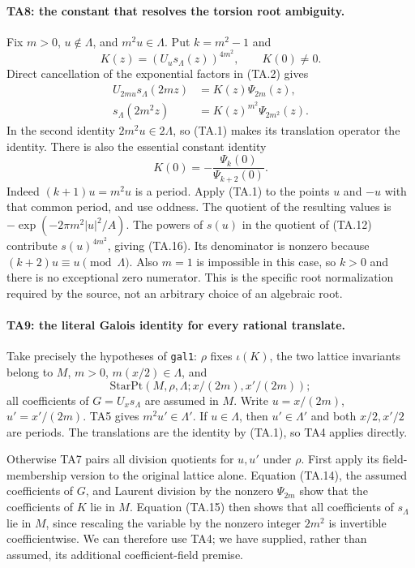 \paragraph{TA8: the constant that resolves the torsion root ambiguity.}
Fix $m>0$, $u\notin\Lambda$, and $m^2u\in\Lambda$.
Put $k=m^2-1$ and
\[
 K(z)=(U_us_\Lambda(z))^{4m^2},\qquad K(0)\ne0.
\]
Direct cancellation of the exponential factors in (TA.2)
gives
\begin{align}
 U_{2mu}s_\Lambda(2mz)&=K(z)\Psi_{2m}(z),                    \tag{TA.14}\\
 s_\Lambda(2m^2z)&=K(z)^{m^2}\Psi_{2m^2}(z).                \tag{TA.15}
\end{align}
In the second identity $2m^2u\in2\Lambda$, so (TA.1) makes
its translation operator the identity.
There is also the essential constant identity
\[
                         K(0)=-\frac{\Psi_k(0)}{\Psi_{k+2}(0)}.
                                                                  \tag{TA.16}
\]
Indeed $(k+1)u=m^2u$ is a period. Apply (TA.1) to the
points $u$ and $-u$ with that common period, and use oddness.
The quotient of the resulting values is
$-\exp(-2\pi m^2|u|^2/A)$. The powers of $s(u)$ in the
quotient of (TA.12) contribute $s(u)^{4m^2}$, giving
(TA.16). Its denominator is nonzero because
$(k+2)u\equiv u\pmod\Lambda$. Also $m=1$ is impossible
in this case, so $k>0$ and there is no exceptional zero
numerator. This is the specific root normalization required
by the source, not an arbitrary choice of an algebraic root.

\paragraph{TA9: the literal Galois identity for every rational translate.}
Take precisely the hypotheses of \texttt{gal1}: $\rho$ fixes
$\iota(K)$, the two lattice invariants belong to $M$, $m>0$,
$m(x/2)\in\Lambda$, and
\[
 \mathrm{StarPt}(M,\rho,\Lambda;x/(2m),x'/(2m));              \tag{TA.17}
\]
all coefficients of $G=U_xs_\Lambda$ are assumed in $M$.
Write $u=x/(2m)$, $u'=x'/(2m)$. TA5 gives
$m^2u'\in\Lambda'$. If $u\in\Lambda$, then $u'\in\Lambda'$
and both $x/2,x'/2$ are periods. The translations are the
identity by (TA.1), so TA4 applies directly.

Otherwise TA7 pairs all division quotients for $u,u'$ under
$\rho$. First apply its field-membership version to the
original lattice alone. Equation (TA.14), the assumed
coefficients of $G$, and Laurent division by the nonzero
$\Psi_{2m}$ show that the coefficients of $K$ lie in $M$.
Equation (TA.15) then shows that all coefficients of
$s_\Lambda$ lie in $M$, since rescaling the variable by the
nonzero integer $2m^2$ is invertible coefficientwise.
We can therefore use TA4; we have supplied, rather than
assumed, its additional coefficient-field premise.

